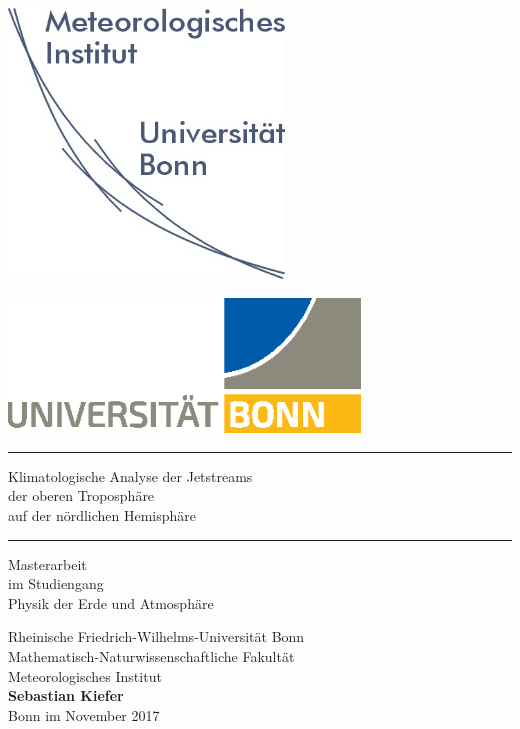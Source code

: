 \begin{titlingpage}

\begin{center}%
\begin{minipage}{0.45\textwidth} %
  \begin{center}
  \includegraphics[width=0.55\textwidth]{01-figures/c-logo_miub} \\
  \end{center}
\end{minipage} 
\hfill %
\begin{minipage}{0.45\textwidth} %
  \begin{center}
  \includegraphics[width=0.7\textwidth]{01-figures/c-logo_uni_2017} \\
  \end{center}
\end{minipage}

\vspace{1cm} \hrule \vspace{1cm}

\begin{LARGE}
  Klimatologische Analyse der Jetstreams \\
  der oberen Troposphäre \\
  auf der nördlichen Hemisphäre \\
\end{LARGE}
\vspace{1cm} \hrule \vfill

\normalsize 
Masterarbeit\\im Studiengang\\
Physik der Erde und Atmosphäre
     
\vfill
Rheinische Friedrich-Wilhelms-Universität Bonn\\
Mathematisch-Naturwissenschaftliche Fakultät\\
Meteorologisches Institut\\

\vfill
\textbf{Sebastian Kiefer} \\ %
Bonn im November 2017
\end{center}
\end{titlingpage}
